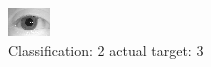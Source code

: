 \begin{figure}[h!]
\begin{center}
\includegraphics[width=0.60\columnwidth]{figures/ID1125_class_2_target_3.png}
\end{center}
\caption{ Classification: 2 actual target: 3}
\label{fig:ID1125_class_2_target_3}
\end{figure}
